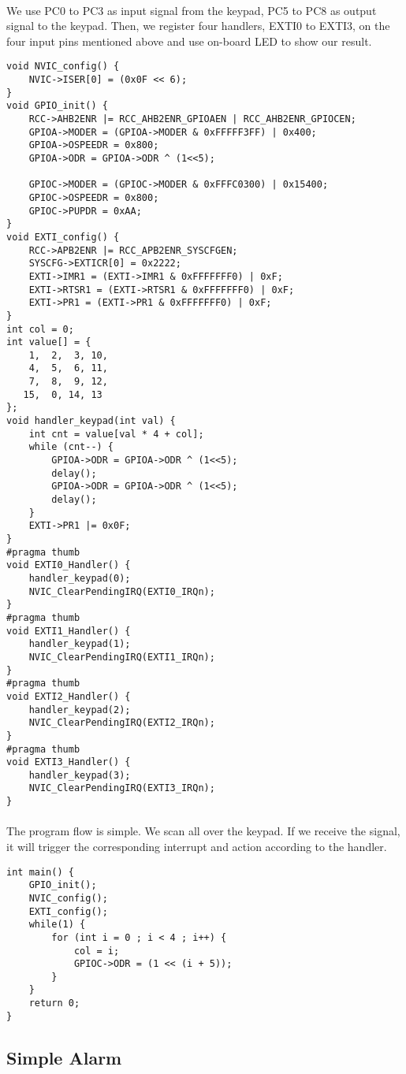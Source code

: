 \paragraph{}
We use PC0 to PC3 as input signal from the keypad, PC5 to PC8 as output signal to the keypad. Then, we register four handlers, EXTI0 to EXTI3, on the four input pins mentioned above and use on-board LED to show our result.
\begin{lstlisting}
void NVIC_config() {
    NVIC->ISER[0] = (0x0F << 6);
}
void GPIO_init() {
	RCC->AHB2ENR |= RCC_AHB2ENR_GPIOAEN | RCC_AHB2ENR_GPIOCEN;
	GPIOA->MODER = (GPIOA->MODER & 0xFFFFF3FF) | 0x400;
	GPIOA->OSPEEDR = 0x800;
	GPIOA->ODR = GPIOA->ODR ^ (1<<5);

	GPIOC->MODER = (GPIOC->MODER & 0xFFFC0300) | 0x15400;
	GPIOC->OSPEEDR = 0x800;
    GPIOC->PUPDR = 0xAA;
}
void EXTI_config() {
    RCC->APB2ENR |= RCC_APB2ENR_SYSCFGEN;
    SYSCFG->EXTICR[0] = 0x2222;
    EXTI->IMR1 = (EXTI->IMR1 & 0xFFFFFFF0) | 0xF;
    EXTI->RTSR1 = (EXTI->RTSR1 & 0xFFFFFFF0) | 0xF;
    EXTI->PR1 = (EXTI->PR1 & 0xFFFFFFF0) | 0xF;
}
int col = 0;
int value[] = {
    1,  2,  3, 10,
    4,  5,  6, 11,
    7,  8,  9, 12,
   15,  0, 14, 13
};
void handler_keypad(int val) {
    int cnt = value[val * 4 + col];
    while (cnt--) {
	    GPIOA->ODR = GPIOA->ODR ^ (1<<5);
        delay();
	    GPIOA->ODR = GPIOA->ODR ^ (1<<5);
        delay();
    }
    EXTI->PR1 |= 0x0F;
}
#pragma thumb
void EXTI0_Handler() {
    handler_keypad(0);
    NVIC_ClearPendingIRQ(EXTI0_IRQn);
}
#pragma thumb
void EXTI1_Handler() {
    handler_keypad(1);
    NVIC_ClearPendingIRQ(EXTI1_IRQn);
}
#pragma thumb
void EXTI2_Handler() {
    handler_keypad(2);
    NVIC_ClearPendingIRQ(EXTI2_IRQn);
}
#pragma thumb
void EXTI3_Handler() {
    handler_keypad(3);
    NVIC_ClearPendingIRQ(EXTI3_IRQn);
}
\end{lstlisting}
\paragraph{}
The program flow is simple. We scan all over the keypad. If we receive the signal, it will trigger the corresponding interrupt and action according to the handler.
\begin{lstlisting}
int main() {
    GPIO_init();
    NVIC_config();
    EXTI_config();
    while(1) {
        for (int i = 0 ; i < 4 ; i++) {
            col = i;
            GPIOC->ODR = (1 << (i + 5));
        }
    }
    return 0;
}
\end{lstlisting}
\subsection{Simple Alarm}
